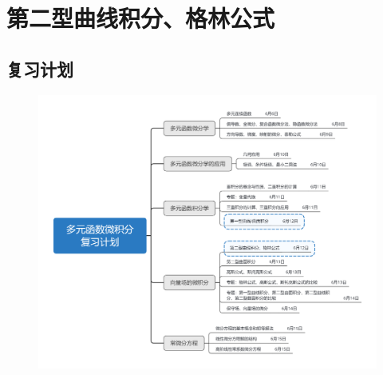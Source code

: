 \documentclass[12pt,UTF8]{ctexart}
\begin{document}
\setcounter{section}{9}
\section{第二型曲线积分、格林公式}
\noindent
\subsection{复习计划}
\begin{figure}[H]
\begin{center}
\includegraphics[height=0.5\textheight]{Figures20190612/plan.png}
\end{center}
\end{figure}
\end{document}

